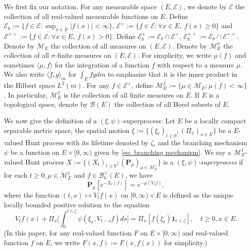 \documentclass[12pt, a4paper]{amsart}
\theoremstyle{definition}
\numberwithin{equation}{section}
\begin{document}
	We first fix our notation.
	For any measurable space $(E,\mathscr E)$, we denote by $\mathscr E$ the collection of all real-valued measurable functions on $E$.
	Define $\mathscr E_b :=\{f \in \mathscr E: \sup_{x\in E}|f(x)|<\infty \}$, $\mathscr E^+ :=\{f\in \mathscr E: \forall x\in E,~f(x)\geq 0\}$ and $\mathscr E^{++} :=\{f\in \mathscr E: \forall x\in E,~f(x)> 0\}$.
	Define $\mathscr E^+_b := \mathscr E_b \cap \mathscr E^+$, $\mathscr E^{++}_b:= \mathscr E_b \cap \mathscr E^{++}$.	
	Denote by $\mathcal M_E$ the collection of all measures on $(E,\mathscr E)$.
	Denote by $\mathcal M^\sigma_E$ the collection of all  $\sigma$-finite measures on $(E,\mathscr E)$.
	For simplicity, we write
		$\mu(f)$ and sometimes $\langle \mu, f\rangle$
	for the integration of a function $f$ with respect to a measure $\mu$.
    We also write $\langle f, g\rangle_m$ for $\int_E fg dm$
    to emphasize that it is the inner product
    in the Hilbert space $L^2(m)$.
		For any $f \in \mathscr E^+$, define $\mathcal M^f_E:= \{\mu \in \mathcal M_E: \mu(f) < \infty\}$.
	In particular, $\mathcal M^1_E$ is the collection of all  finite measures on $E$.
	If $E$ is a topological space, denote by $\mathscr B(E)$ the collection of all  Borel subsets of $E$.
	
	We now give the definition of a $(\xi, \psi)$-superprocess:
	Let $E$ be a locally compact separable metric space,
	the spatial motion
   $\xi:=\{(\xi_t)_{t\geq 0};(\Pi_x)_{x\in E}\}$
	be a $E$-valued Hunt process with its lifetime denoted by $\zeta$, and the branching mechanism $\psi$ be a function on $E\times[0,\infty)$ given by
	\eqref{eq: branching mechanism}.
	We say a $\mathcal M^1_E$-valued Hunt process
    $X:=\{(X_t)_{t\geq 0}; (\mathbf P_\mu)_{\mu \in \mathcal M^1_E}\}$
	is a \emph{$(\xi,\psi)$-superprocess} if for each $t\geq 0, \mu \in \mathcal M_E^1$ and  $f\in \mathscr B^+_b(E)$, we have
\[
	\mathbf P_\mu [e^{-X_t(f)}] = e^{-\mu(V_tf)},
\]
	where the function $(t,x) \mapsto V_tf(x)$ on $[0,\infty) \times E$ is defined as the unique locally bounded positive solution to the equation
\[\label{eq:FKPP_in_definition}
	V_t f(x) + \Pi_x \Big[  \int_0^{t\wedge \zeta} \psi (\xi_s,V_{t-s} f) ds \Big]
	=\Pi_x [ f(\xi_t)\mathbf 1_{t<\zeta} ],\quad
	t\geq 0, x \in E.
\]
	(In this paper, for any real-valued function $F$ on $E\times [0,\infty)$ and real-valued function $f$ on $E$, we write $F(x,f):= F(x,f(x))$ for simplicity.)
\end{document}
